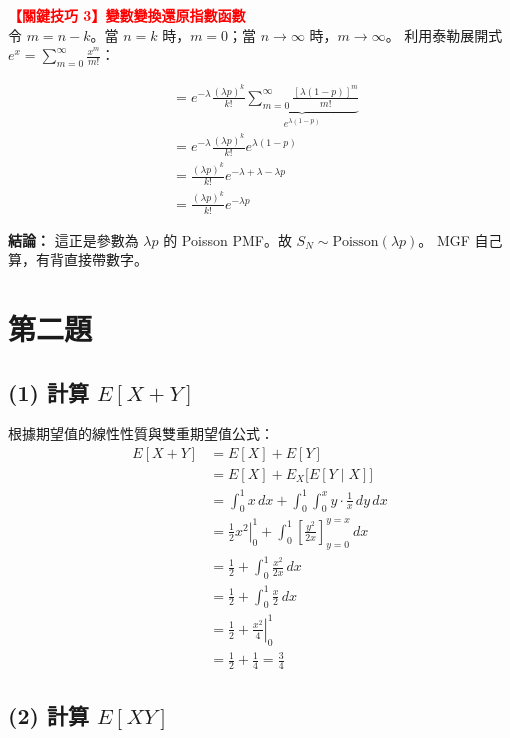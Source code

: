 \documentclass{article}
\begin{document}
\noindent
\textbf{\textcolor{red}{【關鍵技巧 3】變數變換還原指數函數}} \\
令 $m = n - k$。當 $n=k$ 時，$m=0$；當 $n \to \infty$ 時，$m \to \infty$。
利用泰勒展開式 $e^x = \sum_{m=0}^\infty \frac{x^m}{m!}$：

\begin{align*}
&= e^{-\lambda} \frac{(\lambda p)^k}{k!} \underbrace{\sum_{m=0}^\infty \frac{[\lambda(1-p)]^m}{m!}}_{e^{\lambda(1-p)}} \\
&= e^{-\lambda} \frac{(\lambda p)^k}{k!} e^{\lambda(1-p)} \\
&= \frac{(\lambda p)^k}{k!} e^{-\lambda + \lambda - \lambda p} \\
&= \frac{(\lambda p)^k}{k!} e^{-\lambda p}
\end{align*}

\noindent
\textbf{結論：} 這正是參數為 $\lambda p$ 的 Poisson PMF。故 $S_N \sim \text{Poisson}(\lambda p)$。
MGF 自己算，有背直接帶數字。


\hrulefill

\section*{第二題}

\subsection*{(1) 計算 $E[X+Y]$}

根據期望值的線性性質與雙重期望值公式：
\begin{align*}
E[X+Y] &= E[X] + E[Y] \\
&= E[X] + E_X\big[E[Y \mid X]\big] \\
&= \int_0^1 x \, dx + \int_0^1 \int_0^x y \cdot \frac{1}{x} \, dy \, dx \\
&= \left. \frac{1}{2}x^2 \right|_0^1 + \int_0^1 \left[ \frac{y^2}{2x} \right]_{y=0}^{y=x} \, dx \\
&= \frac{1}{2} + \int_0^1 \frac{x^2}{2x} \, dx \\
&= \frac{1}{2} + \int_0^1 \frac{x}{2} \, dx \\
&= \frac{1}{2} + \left. \frac{x^2}{4} \right|_0^1 \\
&= \frac{1}{2} + \frac{1}{4} = \boxed{\frac{3}{4}}
\end{align*}

\subsection*{(2) 計算 $E[XY]$}
\end{document}
